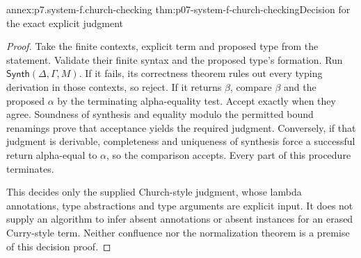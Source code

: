 \begin{annexitem}{annex:p7.system-f.church-checking}
 {thm:p07-system-f-church-checking}{Decision for the exact explicit judgment}
\begin{proof}
Take the finite contexts, explicit term and proposed type from the
statement. Validate their finite syntax and the proposed type's formation.
Run \(\mathsf{Synth}(\Delta,\Gamma,M)\). If it fails, its correctness
theorem rules out every typing derivation in those contexts, so reject.
If it returns \(\beta\), compare \(\beta\) and the proposed
\(\alpha\) by the terminating alpha-equality test. Accept exactly
when they agree. Soundness of synthesis and equality modulo the permitted
bound renamings prove that acceptance yields the required judgment.
Conversely, if that judgment is derivable, completeness and uniqueness of
synthesis force a successful return alpha-equal to \(\alpha\), so the
comparison accepts. Every part of this procedure terminates.

This decides only the supplied Church-style judgment, whose lambda
annotations, type abstractions and type arguments are explicit input.
It does not supply an algorithm to infer absent annotations or absent
instances for an erased Curry-style term. Neither confluence nor the
normalization theorem is a premise of this decision proof.
\end{proof}
\end{annexitem}
